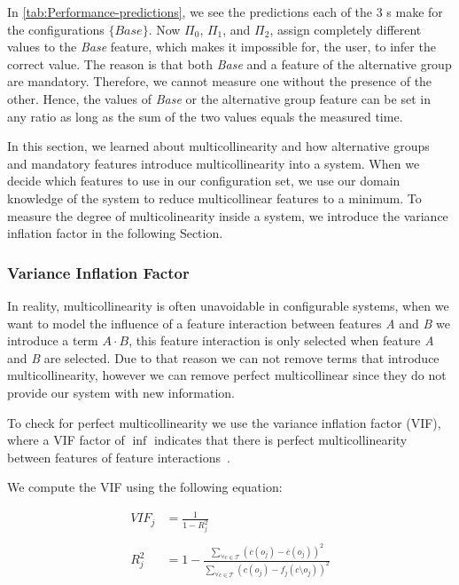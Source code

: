 In \autoref{tab:Performance-predictions}, we see the predictions each of the 3 {\perfInfluenceModel}s make for the configurations $\{Base\}$. 
Now $\Pi_0$, $\Pi_1$, and $\Pi_2$, assign completely different values to the \textit{Base} feature, which makes it impossible for, the user,
to infer the correct value. The reason is that both \textit{Base} and a feature of the alternative group are mandatory. 
Therefore, we cannot measure one without the presence of the other. 
Hence, the values of \textit{Base} or the alternative group feature can be set in any ratio as long as the sum of the two values equals the measured time.

In this section, we learned about multicollinearity and how alternative groups and mandatory features introduce multicollinearity into a system. 
When we decide which features to use in our configuration set, we use our domain knowledge of the system to reduce multicollinear features to a minimum.
To measure the degree of multicolinearity inside a system, we introduce the variance inflation factor in the following Section.

\subsubsection{Variance Inflation Factor}\label{ch:vif}
In reality, multicollinearity is often unavoidable in configurable systems, when we want to model the influence of a feature interaction between features
\textit{A} and \textit{B} we introduce a term $A \cdot B$, this feature interaction is only selected when feature \textit{A} and \textit{B} are selected. 
Due to that reason we can not remove terms that introduce multicollinearity, however we can remove perfect multicollinear since they do not provide our 
system with new information.

To check for perfect multicollinearity we use the variance inflation factor (VIF), where a VIF factor of $\inf$ indicates
that there is perfect multicollinearity between features of feature interactions~\cite{Multicollinearity}.

We compute the VIF using the following equation:

\begin{align}
    VIF_{j} &= \frac{1}{1 - R^{2}_{j}}  \\ \nonumber\\
    R^{2}_{j} &= 1 - \frac{\sum\limits_{\forall c \in \mathcal{T}} (c(o_j) - \overline{c}(o_j))^2} {\sum\limits_{\forall c \in \mathcal{T}}(c(o_j) - f_j(c \setminus o_j))^2}
\end{align}


